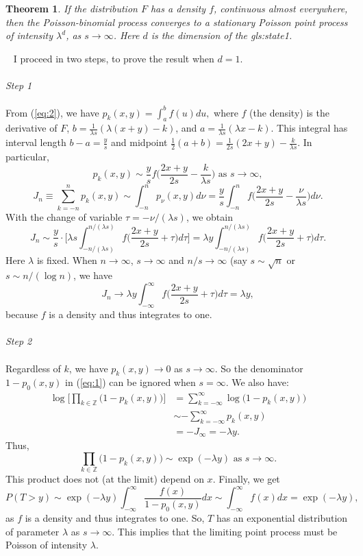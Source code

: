 \documentclass[10pt]{article}
\newtheorem{theorem}{Theorem}[section]
\newenvironment{proof}[1][Proof]{\begin{trivlist}
\item[\hskip \labelsep {\bfseries #1}]}{\end{trivlist}}
\newcommand{\qed}{\nobreak \ifvmode \relax \else
      \ifdim\lastskip<1.5em \hskip-\lastskip
      \hskip1.5em plus0em minus0.5em \fi \nobreak
      \vrule height0.75em width0.5em depth0.25em\fi}
\begin{document}
\begin{theorem}
\label{sums2}
If the distribution $F$ has a density $f$, continuous almost everywhere, then the Poisson-binomial process converges to a stationary Poisson point process of intensity $\lambda^d$, as $s\rightarrow\infty$. Here $d$ is the dimension of the \gls{gls:state1}.
\end{theorem}
\begin{proof}
$ $ \newline \
I proceed in two steps, to prove the result when $d=1$.\\ \\
{\em Step 1} \\ \\
From (\ref{eq:2}), we have
$p_k(x,y) =\int_a^b f(u)du,$
where $f$ (the density) is the derivative of $F$,  $b=\frac{1}{\lambda s}(\lambda (x+y)-k)$, and $a=\frac{1}{\lambda s}(\lambda x-k)$. This integral has interval length $b-a=\frac{y}{s}$ and midpoint $\frac{1}{2}(a+b)=\frac{1}{2s}(2x+y) - \frac{k}{\lambda s}$. In particular, 
$$p_k(x,y)\sim \frac{y}{s}f\Big(\frac{2x+y}{2s}-\frac{k}{\lambda s}\Big) \mbox{ as } s\rightarrow\infty,$$
$$J_n \equiv \sum_{k=-n}^{n} p_k(x,y)\sim \int_{-n}^{n}p_\nu(x,y) d\nu=
\frac{y}{s}\int_{-n}^n f\Big(\frac{2x+y}{2s}-\frac{\nu}{\lambda s}\Big)d\nu.$$
With the change of variable $\tau=-\nu/(\lambda s)$, we obtain
$$J_n \sim \frac{y}{s}\cdot \Big[\lambda s\int_{-n/(\lambda s)}^{n/(\lambda s)} f\Big(\frac{2x+y}{2s}+\tau\Big)d\tau\Big]=\lambda y\int_{-n/(\lambda s)}^{n/(\lambda s)} f\Big(\frac{2x+y}{2s}+\tau\Big)d\tau.$$
Here $\lambda$ is fixed. When $n\rightarrow\infty$, $s\rightarrow \infty$ and $n/s\rightarrow \infty$ (say $s\sim\sqrt{n}$ or $s\sim n/(\log n)$, we have
$$J_n\rightarrow \lambda y\int_{-\infty}^\infty f\Big(\frac{2x+y}{2s}+\tau\Big)d\tau =\lambda y,$$
because $f$ is a density and thus integrates to one. \\ \\
{\em Step 2} \\ \\
Regardless of $k$, we have $p_k(x,y)\rightarrow 0$ as $s\rightarrow\infty$. So the denominator $1-p_0(x,y)$ in (\ref{eq:1}) can be ignored when $s=\infty$. We also have:
\begin{align}
\log\Big[\prod_{k\in\mathbb{Z}} \Big(1-p_k(x,y)\Big)\Big] & =\sum_{k=-\infty}^\infty\log\Big(1-p_k(x,y)\Big) \nonumber \\ 
 & \sim -\sum_{k=-\infty}^\infty p_k(x,y) \nonumber \\
 & = -J_\infty = -\lambda y. \nonumber 
\end{align}
Thus,
$$\prod_{k\in\mathbb{Z}} \Big(1-p_k(x,y)\Big)\sim \exp(-\lambda y) \mbox{ as } s\rightarrow \infty.$$
This product does not (at the limit) depend on $x$. Finally, we get
$$P(T>y)\sim \exp(-\lambda y)\int_{-\infty}^\infty \frac{f(x)}{1-p_0(x,y)}dx\sim \int_{-\infty}^\infty f(x) dx = \exp(-\lambda y),$$
as $f$ is a density and thus integrates to one. So, $T$ has an exponential distribution of parameter $\lambda$ as $s\rightarrow\infty$. This implies that the limiting point process must be Poisson of intensity $\lambda$. \qed
\end{proof}
\end{document}
